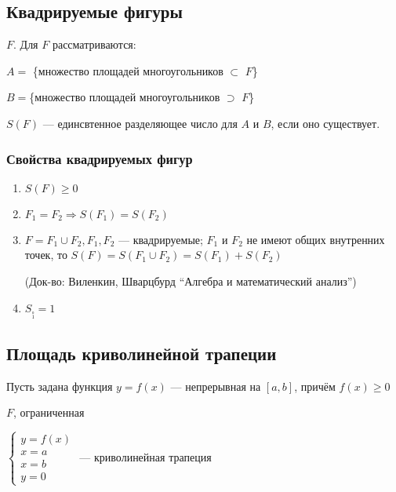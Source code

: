 \documentclass{article}
\begin{document}
    \subsection{Квадрируемые фигуры}
    
    
    \(F.\) Для $F$ рассматриваются:
    
    \(A=\) \{множество площадей многоугольников \(\subset\) $F$\}
    
    \(B = \)\{множество площадей многоугольников \(\supset\) $F$\}

    \(S(F)\) --- единсвтенное разделяющее число для \(A\) и \(B\), если оно существует.
    
    \subsubsection{Свойства квадрируемых фигур}
    
    \begin{enumerate}
        \item \(S(F) \geq 0\)
        \item \(F_1 = F_2 \Rightarrow S(F_1) = S(F_2)\)
        \item \(F = F_1 \cup F_2, F_1, F_2\) --- квадрируемые; \(F_1\) и \(F_2\) не имеют общих внутренних точек, то \(S(F) = S(F_1 \cup F_2) = S(F_1) + S(F_2)\)
        
        (Док-во: Виленкин, Шварцбурд ``Алгебра и математический анализ'') %
        \item \(S_{\underset 1 \square} = 1\)
    
    \end{enumerate}


    \subsection{Площадь криволинейной трапеции}
    
    Пусть задана функция \(y = f(x)\) --- непрерывная на \([a, b]\), причём \underline{\(f(x) \geq 0\)}

    $F$, ограниченная 

    \(\begin{cases}
        y = f(x)\\
        x = a\\
        x = b\\
        y = 0
    \end{cases}\) --- криволинейная трапеция
\end{document}
